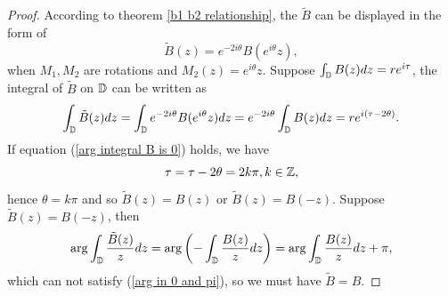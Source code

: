\documentclass[review,onefignum,onetabnum]{siamonline190516}
\begin{document}
    \begin{proof}
        According to theorem \ref{b1 b2 relationship}, the $\tilde{B}$ can be displayed in the form of
        \begin{equation*}
        \tilde{B}(z) = e^{-2 i \theta} B(e^{i\theta} z),
        \end{equation*}
        when $M_1, M_2$ are rotations and $M_2(z) = e^{i \theta} z$. Suppose $\int_{\mathbb{D}} B(z) dz = r e^{i \tau}$, the integral of $\tilde{B}$ on $\mathbb{D}$ can be written as
        \begin{equation}
            \int_{\mathbb{D}} \tilde{B}(z) dz
            = \int_{\mathbb{D}} e^{-2i\theta} B(e^{i\theta} z) dz
            = e^{-2i\theta} \int_{\mathbb{D}} B(z) dz
            = r e^{i(\tau-2\theta)}.
        \end{equation}
        If equation (\ref{arg integral B is 0}) holds, we have
        \begin{equation*}
            \tau = \tau-2\theta  = 2k\pi ,k \in \mathbb{Z},
        \end{equation*}
        hence $\theta = k \pi$ and so $\tilde{B}(z) = B(z)$ or $\tilde{B}(z) = B(-z)$. Suppose $\tilde{B}(z) = B(-z)$, then
        \begin{equation*}
            \arg  \int_{\mathbb{D}} \frac{\tilde{B}(z)}{z} dz 
            = \arg \left(- \int_{\mathbb{D}} \frac{B(z)}{z} dz \right)
            = \arg \int_{\mathbb{D}} \frac{B(z)}{z} dz + \pi,
        \end{equation*}
        which can not satisfy (\ref{arg in 0 and pi}), so we must have $\tilde{B} = B$.
    \end{proof}
    
    \bigskip
    
\end{document}
